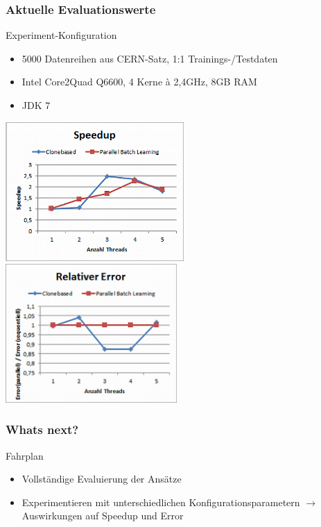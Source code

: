 \documentclass[18pt]{beamer}
\begin{document}
	\begin{frame}\frametitle{Aktuelle Evaluationswerte}
		\begin{block}{Experiment-Konfiguration}
			\begin{itemize}
				\item 5000 Datenreihen aus CERN-Satz, 1:1 Trainings-/Testdaten
				\item Intel Core2Quad Q6600, 4 Kerne à 2,4GHz, 8GB RAM
				\item JDK 7
			\end{itemize}
		\end{block}
		\includegraphics[width=0.51\textwidth]{images/eval_speedup.png}
		\includegraphics[width=0.49\textwidth]{images/eval_error.png}
	\end{frame}

	\begin{frame}\frametitle{Whats next?}
		\begin{block}{Fahrplan}
		    \begin{itemize}
		    	\item Vollständige Evaluierung der Ansätze
		    	\item Experimentieren mit unterschiedlichen Konfigurationsparametern $\rightarrow$ Auswirkungen auf Speedup und Error
		    \end{itemize}
		\end{block}
	\end{frame}
\end{document}
